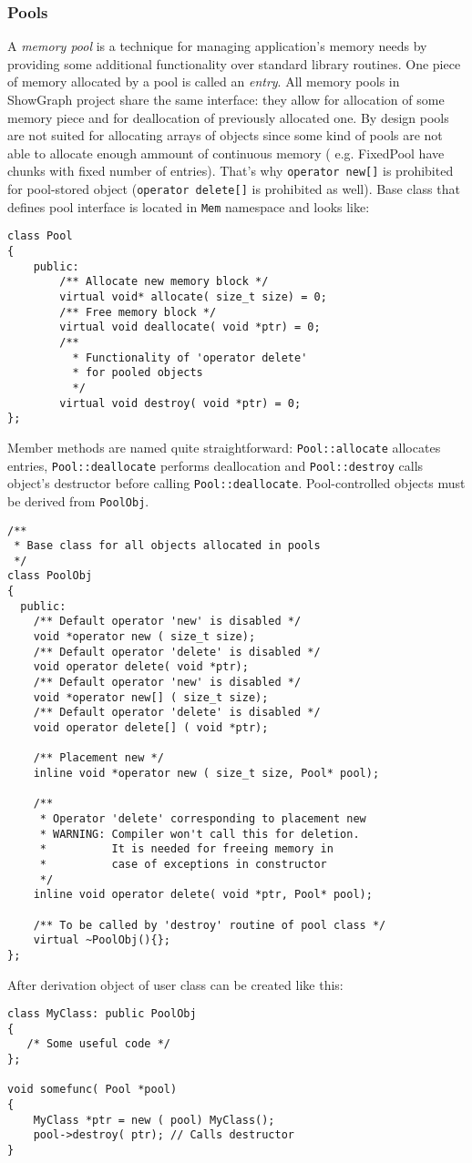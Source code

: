 \documentclass[11pt,twoside,a4paper]{article}
\begin{document}
\subsubsection{Pools}
A \emph{memory pool} is a technique for managing application's memory needs by providing some additional functionality over standard library routines. One piece of memory allocated by a pool is called an \emph{entry}. All memory pools in ShowGraph project share the same interface: they allow for allocation of some memory piece and for deallocation of previously allocated one. By design pools are not suited for allocating arrays of objects since some kind of pools are not able to allocate enough ammount of continuous memory ( e.g. FixedPool have chunks with fixed number of entries). That's why \lstinline{operator new[]} is prohibited for pool-stored object (\lstinline{operator delete[]} is prohibited as well). Base class that defines pool interface is located in \lstinline{Mem} namespace and looks like:
\begin{lstlisting}
class Pool
{
    public:
        /** Allocate new memory block */
        virtual void* allocate( size_t size) = 0;
        /** Free memory block */
        virtual void deallocate( void *ptr) = 0;
        /** 
          * Functionality of 'operator delete'
          * for pooled objects
          */
        virtual void destroy( void *ptr) = 0;
};
\end{lstlisting}
Member methods are named quite straightforward: \lstinline{Pool::allocate} allocates entries, \lstinline{Pool::deallocate} performs deallocation and  \lstinline{Pool::destroy} calls object's destructor before calling  \lstinline{Pool::deallocate}. Pool-controlled objects must be derived from  \lstinline{PoolObj}.
\begin{lstlisting}
/**
 * Base class for all objects allocated in pools
 */    
class PoolObj
{
  public:
    /** Default operator 'new' is disabled */
    void *operator new ( size_t size);
    /** Default operator 'delete' is disabled */
    void operator delete( void *ptr);
    /** Default operator 'new' is disabled */
    void *operator new[] ( size_t size);
    /** Default operator 'delete' is disabled */
    void operator delete[] ( void *ptr);
       
    /** Placement new */
    inline void *operator new ( size_t size, Pool* pool);
    
    /**
     * Operator 'delete' corresponding to placement new
     * WARNING: Compiler won't call this for deletion. 
     *          It is needed for freeing memory in  
     *          case of exceptions in constructor
     */
    inline void operator delete( void *ptr, Pool* pool);
    
    /** To be called by 'destroy' routine of pool class */
    virtual ~PoolObj(){};
};
\end{lstlisting}
After derivation object of user class can be created like this:
\begin{lstlisting}
class MyClass: public PoolObj
{
   /* Some useful code */        
};

void somefunc( Pool *pool)
{
    MyClass *ptr = new ( pool) MyClass();
    pool->destroy( ptr); // Calls destructor
}
\end{lstlisting}
\end{document}
